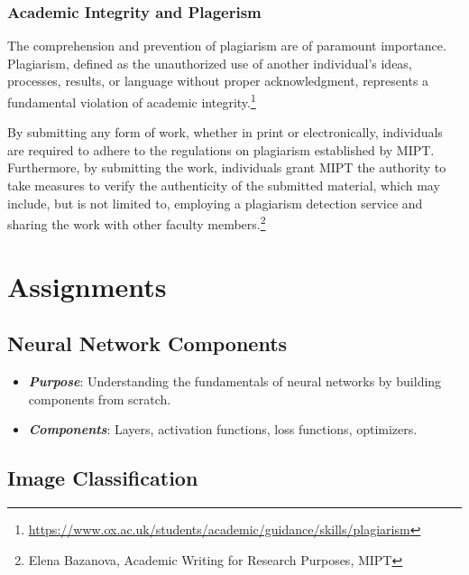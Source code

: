\documentclass[
]{book}
\begin{document}
\hypertarget{academic-integrity-and-plagerism}{%
\subsection{Academic Integrity and Plagerism}\label{academic-integrity-and-plagerism}}

The comprehension and prevention of plagiarism are of paramount importance. Plagiarism, defined as the unauthorized use of another individual's ideas, processes, results, or language without proper acknowledgment, represents a fundamental violation of academic integrity.\footnote{\url{https://www.ox.ac.uk/students/academic/guidance/skills/plagiarism}}

By submitting any form of work, whether in print or electronically, individuals are required to adhere to the regulations on plagiarism established by MIPT. Furthermore, by submitting the work, individuals grant MIPT the authority to take measures to verify the authenticity of the submitted material, which may include, but is not limited to, employing a plagiarism detection service and sharing the work with other faculty members.\footnote{Elena Bazanova, Academic Writing for Research Purposes, MIPT}

\hypertarget{assignments}{%
\chapter{Assignments}\label{assignments}}

\hypertarget{Neural_Network_Components}{%
\section{Neural Network Components}\label{Neural_Network_Components}}

\begin{itemize}
\item
  \textbf{\emph{Purpose}}: Understanding the fundamentals of neural networks by building components from scratch.
\item
  \textbf{\emph{Components}}: Layers, activation functions, loss functions, optimizers.
\end{itemize}

\hypertarget{Image_Classification}{%
\section{Image Classification}\label{Image_Classification}}
\end{document}
